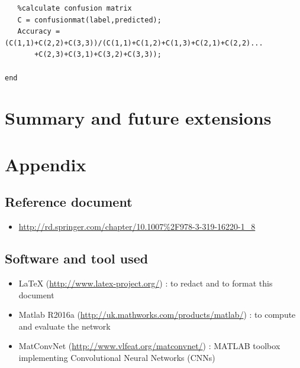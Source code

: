 \documentclass[]{report}
\begin{document}
\begin{lstlisting}
   %calculate confusion matrix
   C = confusionmat(label,predicted);
   Accuracy = (C(1,1)+C(2,2)+C(3,3))/(C(1,1)+C(1,2)+C(1,3)+C(2,1)+C(2,2)...
       +C(2,3)+C(3,1)+C(3,2)+C(3,3));
   
end

\end{lstlisting}


\chapter{Summary and future extensions}

\chapter{Appendix}

\section{Reference document}
 \begin{itemize}
 
 	\item\url{http://rd.springer.com/chapter/10.1007%2F978-3-319-16220-1_8}
	
 \end{itemize}

\section{Software and tool used}

\begin{itemize}
	
	\item LaTeX (\url{http://www.latex-project.org/}) : to redact and to format this document
	
	\item Matlab R2016a (\url{http://uk.mathworks.com/products/matlab/}) : to compute and 					  evaluate the network
	
	\item MatConvNet (\url{http://www.vlfeat.org/matconvnet/}) : MATLAB toolbox implementing 				  Convolutional Neural Networks (CNNs) 
	 
\end{itemize}
\end{document}
